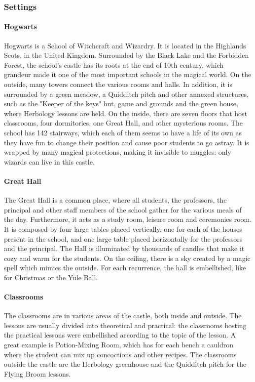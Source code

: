 \pagebreak

\subsubsection{Settings}
\paragraph{Hogwarts}
Hogwarts is a School of Witchcraft and Wizardry. It is located in the Highlands Scots, in the United Kingdom. Surrounded by the Black Lake and the Forbidden Forest, the school's castle has its roots at the end of 10th century, which grandeur made it one of the most important schools in the magical world. On the outside, many towers connect the various rooms and halls. In addition, it is surrounded by a green meadow, a Quidditch pitch and other annexed structures, such as the "Keeper of the keys" hut, game and grounds and the green house, where Herbology lessons are held. On the inside, there are seven floors that host classrooms, four dormitories, one Great Hall, and other mysterious rooms. The school has 142 stairways, which each of them seems to have a life of its own as they have fun to change their position and cause poor students to go astray. It is wrapped by many magical protections, making it invisible to muggles: only wizards can live in this castle. 

\paragraph{Great Hall}
The Great Hall is a common place, where all students, the professors, the principal and other staff members of the school gather for the various meals of the day. Furthermore, it acts as a study room, leisure room and ceremonies room. It is composed by four large tables placed vertically, one for each of the houses present in the school, and one large table placed horizontally for the professors and the principal. The Hall is illuminated by thousands of candles that make it cozy and warm for the students. On the ceiling, there is a sky created by a magic spell which mimics the outside. For each recurrence, the hall is embellished, like for Christmas or the Yule Ball. 

\paragraph{Classrooms}
The classrooms are in various areas of the castle, both inside and outside. The lessons are usually divided into theoretical and practical: the classrooms hosting the practical lessons were embellished according to the topic of the lesson. A great example is Potion-Mixing Room, which has for each bench a cauldron where the student can mix up concoctions and other recipes. The classrooms outside the castle are the Herbology greenhouse and the Quidditch pitch for the Flying Broom lessons. 

